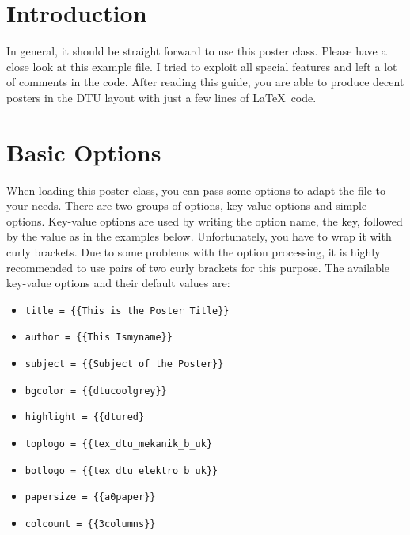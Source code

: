 \documentclass[
   ,highlight = dtublue
   ,toplogo   = {{tex_dtu_electro_b_uk}}
   ,botlogo   = {{DG_logo_CMYK_red-cropped}}
   ,toprightlogo = {{DTU-logo-blue-cmyk}}
   ,papersize = {{a0paper}}
   ,colcount  = {{2columns}}
   ,nocrop
]{dtuposter}
\begin{document}
%
%
\begin{dtuposterhead} %
\end{dtuposterhead}
%
%
\begin{dtupostercontent}
\section{Introduction}
In general, it should be straight forward to use this poster class. Please
have a close look at this example file. I tried to exploit all special 
features and left a lot of comments in the code. After reading this 
guide, you are able to produce decent posters in the DTU layout with
just a few lines of \LaTeX\ code. 

\section{Basic Options}
When loading this poster class, you can pass some options to adapt the 
file to your needs. There are two groups of options, key-value options 
and simple options. Key-value options are used by writing the option 
name, the key, followed by the value as in the examples below. 
Unfortunately, you have to
wrap it with curly brackets. Due to some problems with the option 
processing, it is highly recommended to use pairs of two curly brackets
for this purpose. The available key-value options and their 
default values are:
\begin{itemize}
\item \texttt{title     = \{\{This is the Poster Title\}\}}
\item \texttt{author    = \{\{This Ismyname\}\}}
\item \texttt{subject   = \{\{Subject of the Poster\}\}}
\item \texttt{bgcolor   = \{\{dtucoolgrey\}\}}
\item \texttt{highlight = \{\{dtured\}}
\item \texttt{toplogo   = \{\{tex\_dtu\_mekanik\_b\_uk\}}
\item \texttt{botlogo   = \{\{tex\_dtu\_elektro\_b\_uk\}\}}
\item \texttt{papersize = \{\{a0paper\}\}}
\item \texttt{colcount  = \{\{3columns\}\}}
\end{itemize}


\end{dtupostercontent}
\end{document}
